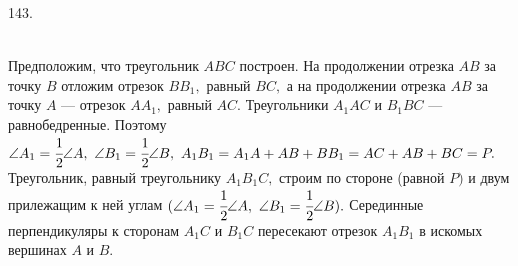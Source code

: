 143. \begin{figure}[ht!]
\end{figure}\\
Предположим, что треугольник $ABC$ построен. На продолжении отрезка $AB$ за точку $B$ отложим отрезок $BB_1,$ равный $BC,$ а на продолжении отрезка $AB$ за точку $A$ --- отрезок $AA_1,$ равный $AC.$ Треугольники $A_1AC$ и $B_1BC$ --- равнобедренные. Поэтому  $\angle A_1 = \cfrac{1}{2} \angle A,\  \angle B_1 = \cfrac{1}{2} \angle B,\ A_1B_1 = A_1A + AB + BB_1 = AC + AB + BC = P.$ Треугольник, равный треугольнику $A_1B_1C,$ строим по стороне (равной $P)$ и двум прилежащим к ней углам
$(\angle A_1 = \cfrac{1}{2}\angle A,\ \angle B_1 =\cfrac{1}{2}\angle B).$  Серединные перпендикуляры к сторонам $A_1C$ и $B_1C$ пересекают отрезок $A_1B_1$ в искомых вершинах $A$ и $B.$\\
